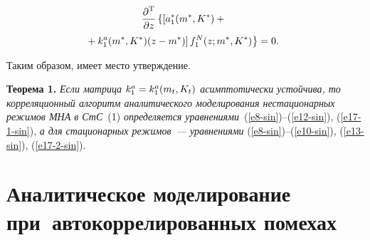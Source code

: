 \begin{multicols}{2}
\vspace*{-12pt}

    \noindent
    \begin{multline}
    \fr{\partial^{\mathrm{T}}}{\partial z}\left\{\left[ a_1^*(m^*,K^*)+{}\right.\right.\\
\hspace*{-3mm}\left.\left.    {}+k_1^a(m^*,K^*)(z-
m^*)\right] f_1^N (z;m^*,K^*)\right\}=0.
    \label{e17-2-sin}
  \end{multline}
    \renewcommand{\theequation}{\arabic{equation}}
    \setcounter{equation}{13}
  
  Таким образом, имеет место утверждение.
  
  \medskip
  
  \noindent
  \textbf{Теорема 1.} \textit{Если мат\-ри\-ца $k_1^a\hm=k_1^a(m_t,K_t)$ 
асимп\-то\-тически устойчива, то корреляционный алгоритм аналитического 
моделирования нестационарных режимов МНА в СтС}~(1) \textit{определяется 
уравнениями}~(\ref{e8-sin})--(\ref{e12-sin}), (\ref{e17-1-sin}), \textit{а для 
стационарных режимов~--- урав\-не\-ни\-ями} (\ref{e8-sin})--(\ref{e10-sin}), 
(\ref{e13-sin}), (\ref{e17-2-sin}).
  

\section{Аналитическое моделирование при~автокоррелированных 
помехах}
  

\end{multicols}

